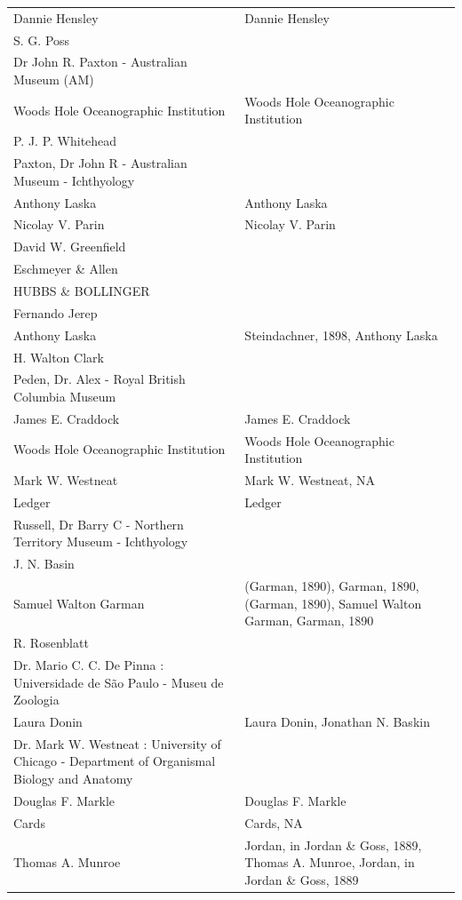 \documentclass[sn-apa,pdflatex]{sn-jnl}
\begin{document}
\begin{longtable}[t]{>{\raggedright\arraybackslash}p{25em}>{\raggedright\arraybackslash}p{25em}}
Dannie Hensley & Dannie Hensley\\
S. G. Poss & \\
Dr John R. Paxton - Australian Museum (AM) & \\
Woods Hole Oceanographic Institution & Woods Hole Oceanographic \vphantom{3} Institution\\
\addlinespace
P. J. P. Whitehead & \\
Paxton, Dr John R - Australian Museum - Ichthyology & \\
Anthony Laska & Anthony Laska\\
Nicolay V. Parin & Nicolay V. Parin\\
David W. Greenfield & \\
\addlinespace
Eschmeyer \& Allen & \\
HUBBS \& BOLLINGER & \\
Fernando Jerep & \\
Anthony Laska & Steindachner, 1898, Anthony Laska\\
H. Walton Clark \vphantom{1} & \\
\addlinespace
Peden, Dr. Alex - Royal British Columbia Museum \vphantom{2} & \\
James E. Craddock & James E. \vphantom{1} Craddock\\
Woods Hole Oceanographic Institution & Woods Hole Oceanographic \vphantom{2} Institution\\
Mark W. Westneat & Mark W. Westneat, NA\\
Ledger & \vphantom{2} Ledger\\
\addlinespace
Russell, Dr Barry C - Northern Territory Museum - Ichthyology & \\
J. N. Basin & \\
Samuel Walton Garman & (Garman, 1890), Garman, 1890, (Garman, 1890), Samuel Walton Garman, Garman, 1890\\
R. Rosenblatt & \\
Dr. Mario C. C. De Pinna : Universidade de São Paulo - Museu de Zoologia & \\
\addlinespace
Laura Donin & Laura Donin, Jonathan N. Baskin\\
Dr. Mark W. Westneat : University of Chicago - Department of Organismal Biology and Anatomy \vphantom{4} & \\
Douglas F. Markle & Douglas F. \vphantom{1} Markle\\
Cards & Cards, NA\\
Thomas A. Munroe & Jordan, in Jordan \& Goss, 1889, Thomas A. Munroe, Jordan, in Jordan \& Goss, 1889\\

\end{longtable}
\end{document}
